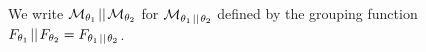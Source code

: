 \documentclass[preview]{standalone}
\begin{document}
We write $\view[\viewppty_1] \pll \view[\viewppty_2]$ for $\view[\viewppty_1 \pll \viewppty_2]$ defined by the grouping function \grpfctN $\grpfct[\viewppty_1] \pll \grpfct[\viewppty_2] = \grpfct[\viewppty_1 \pll \viewppty_2]$.
%
%
\end{document}
